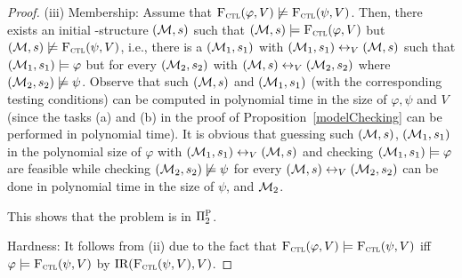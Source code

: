 \documentclass{article}
\begin{document}
\begin{proof}
(iii) Membership: Assume that ${\textsc{F}_{\textsc{ctl}}}(\varphi, V) \not \models {\textsc{F}_{\textsc{ctl}}}(\psi, V)$. Then, there exists an initial \MPK-structure $({\cal M}, s)$ such that $({\cal M}, s)\models {\textsc{F}_{\textsc{ctl}}}(\varphi, V)$ but $({\cal M}, s) \not \models {\textsc{F}_{\textsc{ctl}}}(\psi, V)$, i.e., there is a $({\cal M}_1, s_1)$ with $({\cal M}_1, s_1) \leftrightarrow_V ({\cal M}, s)$ such that $({\cal M}_1, s_1) \models \varphi$ but  for every $({\cal M}_2, s_2)$ with $({\cal M}, s) \leftrightarrow_V ({\cal M}_2, s_2)$ where $({\cal M}_2, s_2) \not \models \psi$. Observe  that such $({\cal M}, s)$ and $({\cal M}_1, s_1)$ (with the corresponding testing conditions) can be computed in polynomial time in the size of $\varphi, \psi$ and $V$ (since the tasks (a) and (b) in the proof of Proposition~\ref{modelChecking} can be performed in polynomial time).
It is obvious that guessing such $({\cal M}, s)$, $({\cal M}_1, s_1)$ in the polynomial size of $\varphi$ with $({\cal M}_1, s_1) \leftrightarrow_V ({\cal M}, s)$ and checking $({\cal M}_1, s_1)\models \varphi$ are feasible while checking $({\cal M}_2, s_2) \not \models \psi$ for every $({\cal M}, s) \leftrightarrow_V ({\cal M}_2, s_2)$ can be done in polynomial time in the size of $\psi$, and ${\cal M}_2$.

This shows that the problem is in $\Pi_2^{\textsc{P}}$.

Hardness: It follows from (ii) due to the fact that ${\textsc{F}_{\textsc{ctl}}}(\varphi, V) \models {\textsc{F}_{\textsc{ctl}}}(\psi, V)$ iff $\varphi \models {\textsc{F}_{\textsc{ctl}}}(\psi, V)$ by $\textrm{IR}({\textsc{F}_{\textsc{ctl}}}(\psi, V), V)$.





\end{proof}
\end{document}
